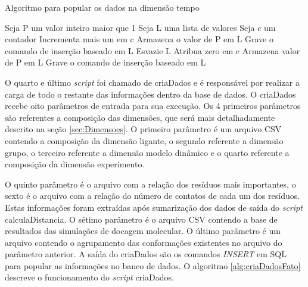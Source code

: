 \begin{algorithm}[H]
\caption{Algoritmo para popular os dados na dimensão tempo}
\label{alg:criaDadosDIMTempo}
{\fontsize{10}{10}\selectfont
\begin{algorithmic}[1]
	\STATE Seja P um valor inteiro maior que 1
	\STATE Seja L uma lista de valores
	\STATE Seja c um contador
		\STATE Incrementa mais um em c
			\STATE Armazena o valor de P em L
			\STATE Grave o comando de inserção baseado em L
			\STATE Esvazie L
			\STATE Atribua zero em c
		\ELSE
			\STATE Armazena valor de P em L
		\ENDIF
	\ENDFOR
		\STATE Grave o comando de inserção baseado em L
	\ENDIF
\end{algorithmic}
}
\end{algorithm}

O quarto e último \emph{script} foi chamado de criaDados e é responsável por realizar a carga de todo o restante das informações dentro da base de dados. O criaDados recebe oito parâmetros de entrada para sua execução. Os 4 primeiros parâmetros são referentes a composição das dimensões, que será mais detalhadamente descrito na seção \ref{sec:Dimensoes}. O primeiro parâmetro é um arquivo CSV contendo a composição da dimensão ligante, o segundo referente a dimensão grupo, o terceiro referente a dimensão modelo dinâmico e o quarto referente a composição da dimensão experimento. 

O quinto parâmetro é o arquivo com a relação dos resíduos mais importantes, o sexto é o arquivo com a relação do número de contatos de cada um dos resíduos. Estas informações foram extraídas após sumarização dos dados de saída do \emph{script} calculaDistancia. O sétimo parâmetro é o arquivo CSV contendo a base de resultados das simulações de docagem molecular. O último parâmetro é um arquivo contendo o agrupamento das conformações existentes no arquivo do parâmetro anterior. A saída do criaDados são os comandos \emph{INSERT} em SQL para popular as informações no banco de dados. O algoritmo \ref{alg:criaDadosFato} descreve o funcionamento do \emph{script} criaDados.

